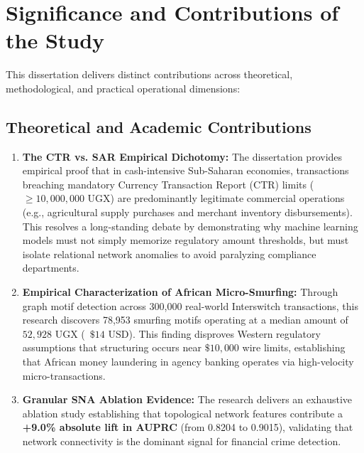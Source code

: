 \section{Significance and Contributions of the Study}
This dissertation delivers distinct contributions across theoretical, methodological, and practical operational dimensions:

\subsection{Theoretical and Academic Contributions}
\begin{enumerate}
    \item \textbf{The CTR vs. SAR Empirical Dichotomy:} The dissertation provides empirical proof that in cash-intensive Sub-Saharan economies, transactions breaching mandatory Currency Transaction Report (CTR) limits ($\ge 10,000,000\text{ UGX}$) are predominantly legitimate commercial operations (e.g., agricultural supply purchases and merchant inventory disbursements). This resolves a long-standing debate by demonstrating why machine learning models must not simply memorize regulatory amount thresholds, but must isolate relational network anomalies to avoid paralyzing compliance departments.
    \item \textbf{Empirical Characterization of African Micro-Smurfing:} Through graph motif detection across 300,000 real-world Interswitch transactions, this research discovers 78,953 smurfing motifs operating at a median amount of $52,928\text{ UGX}$ (~$\$14\text{ USD}$). This finding disproves Western regulatory assumptions that structuring occurs near $\$10,000$ wire limits, establishing that African money laundering in agency banking operates via high-velocity micro-transactions.
    \item \textbf{Granular SNA Ablation Evidence:} The research delivers an exhaustive ablation study establishing that topological network features contribute a \textbf{+9.0\% absolute lift in AUPRC} (from 0.8204 to 0.9015), validating that network connectivity is the dominant signal for financial crime detection.
\end{enumerate}


